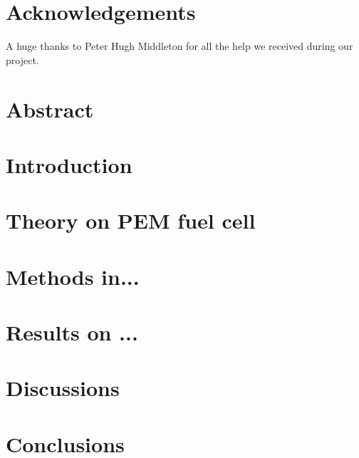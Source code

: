 \documentclass[a4paper,twoside,11pt]{report}
\begin{document}
\pagestyle{empty} %


\clearpage
{}
\chapter*{Acknowledgements}

    A huge thanks to Peter Hugh Middleton for all the help we received during our project. 

\clearpage
\chapter*{Abstract}

\clearpage
\tableofcontents
\listoffigures
\listoftables
\cleardoublepage %
\pagestyle{plain} %

\clearpage
{}

\chapter{Introduction}
    

\chapter{Theory on PEM fuel cell}
    
    

\chapter{Methods in... }
    
    
\chapter{Results on ...}
    



\chapter{Discussions}
    

\chapter{Conclusions}

\nocite{*}
\end{document}
